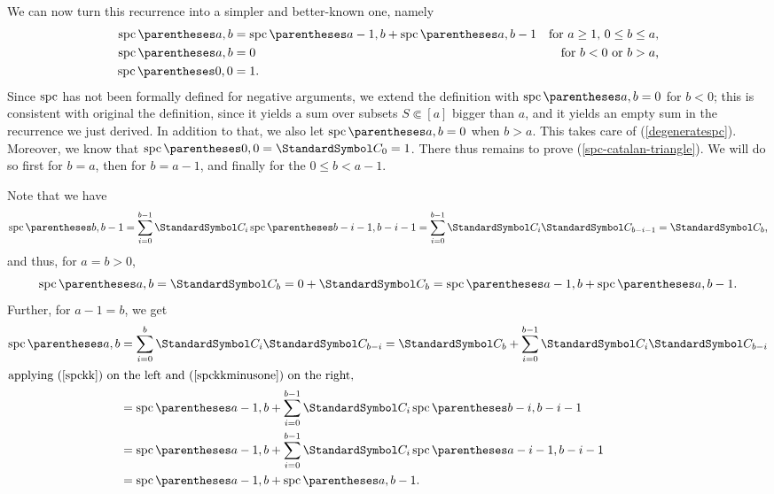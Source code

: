 We can now turn this recurrence into a simpler and better-known one, namely
\begin{align}
\spc\of{a,b} &= \spc\of{a-1, b} + \spc\of{a,b-1} & \text{for $a\geq 1$, $0\leq b \leq a$,}\label{spc-catalan-triangle}\\
\spc\of{a,b} &= 0 & \text{for $b < 0$ or $b > a$,}\label{degeneratespc}\\
\spc\of{0,0} &= 1 \label{spc00}\text.
\end{align}
Since $\operatorname{spc}$ has not been formally defined for negative arguments, we extend the definition
with $\spc\of{a,b}=0$ for $b<0$; this is consistent with original the definition, since it yields a sum over
subsets $S\Subset [a]$ bigger than $a$, and it yields an empty sum in the recurrence we just derived.
In addition to that, we also let $\spc\of{a,b} = 0$ when $b > a$. This takes care of (\ref{degeneratespc}).
Moreover, we know that $\spc\of{0,0}=\CatalanNumber 0=1$. There thus remains to prove (\ref{spc-catalan-triangle}).
We will do so first for $b=a$, then for $b=a-1$, and finally for the $0\leq b < a-1$.

Note that we have\begin{align}
\spc\of{b, b-1}
= \sum{i=0}[b-1]\CatalanNumber {i}\spc\of{b-i-1,b-i-1} 
= \sum{i=0}[b-1]\CatalanNumber {i}\CatalanNumber {b-i-1}
= \CatalanNumber {b}\text,\label{spckkminusone}
\end{align}
and thus, for $a=b > 0$,
\begin{equation}
\spc\of{a,b} = \CatalanNumber b = 0 + \CatalanNumber b = \spc\of{a-1, b} + \spc\of{a, b-1}.
\end{equation}
Further, for $a - 1 = b$, we get
\begin{align}
\spc\of{a,b}
&= \sum{i=0}[b]\CatalanNumber {i}\CatalanNumber {b-i} =
\CatalanNumber b + \sum{i=0}[b-1]\CatalanNumber{i}\CatalanNumber {b-i} \nonumber\\
\intertext{applying (\ref{spckk}) on the left and (\ref{spckkminusone}) on the right,}
&= \spc\of{a-1, b} + \sum{i=0}[b-1]\CatalanNumber {i}\spc\of{b-i,b-i-1} \nonumber\\
&= \spc\of{a-1, b} + \sum{i=0}[b-1]\CatalanNumber {i}\spc\of{a-i-1,b-i-1} \nonumber\\
&= \spc\of{a-1, b} + \spc\of{a,b-1}\text.
\end{align}

